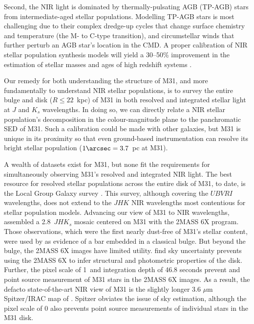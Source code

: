 \documentclass[iop]{emulateapj}
\newcommand{\eg}{\textit{e.g.,~}}
\begin{document}
Second, the NIR light is dominated by thermally-pulsating AGB (TP-AGB) stars from intermediate-aged stellar populations.
Modelling TP-AGB stars is most challenging due to their complex dredge-up cycles that change surface chemistry and temperature (the M- to C-type transition), and circumstellar winds that further perturb an AGB star's location in the CMD.
A proper calibration of NIR stellar population synthesis models \cite[\eg][Charlot \& Bruzual in prep.]{Maraston:2005} will yield a 30--50\% improvement in the estimation of stellar masses and ages of high redshift systems \citep[\eg][]{Maraston:2006,Bruzual:2007,Conroy:2010b}.

Our remedy for both understanding the structure of M31, and more fundamentally to understand NIR stellar populations, is to survey the entire bulge and disk ($R \leq 22$~kpc) of M31 in both resolved and integrated stellar light at $J$ and $K_s$ wavelengths.
In doing so, we can directly relate a NIR stellar population's decomposition in the colour-magnitude plane to the panchromatic SED of M31.
Such a calibration could be made with other galaxies, but M31 is unique in its proximity so that even ground-based instrumentation can resolve its bright stellar population ($1\arcsec = 3.7$~pc at M31).

A wealth of datasets exist for M31, but none fit the requirements for simultaneously observing M31's resolved and integrated NIR light.
The best resource for resolved stellar populations across the entire disk of M31, to date, is the Local Group Galaxy survey \cite[LGGS][]{Williams:2003,Massey:2006}.
This survey, although covering the $UBVRI$ wavelengths, does not extend to the $JHK$ NIR wavelengths most contentious for stellar population models.
Advancing our view of M31 to NIR wavelengths, \cite{Beaton:2007} assembled a 2.8\arcdeg\ $JHK_s$ mosaic centered on M31 with the 2MASS 6X program.
Those observations, which were the first nearly dust-free of M31's stellar content, were used by \cite{Athanassoula:2006} as evidence of a bar embedded in a classical bulge.
But beyond the bulge, the 2MASS 6X images have limited utility.
\cite{Courteau:2011} find sky uncertainty prevents using the 2MASS 6X to infer structural and photometric properties of the disk.
Further, the pixel scale of 1\arcsec\ and integration depth of 46.8 seconds prevent and point source measurement of M31 stars in the 2MASS 6X images.
As a result, the defacto state-of-the-art NIR view of M31 is the slightly longer 3.6 $\mu$m Spitzer/IRAC map of \cite{Barmby:2006}.
Spitzer obviates the issue of sky estimation, although the pixel scale of 0 also prevents point source measurements of individual stars in the M31 disk.
\end{document}
